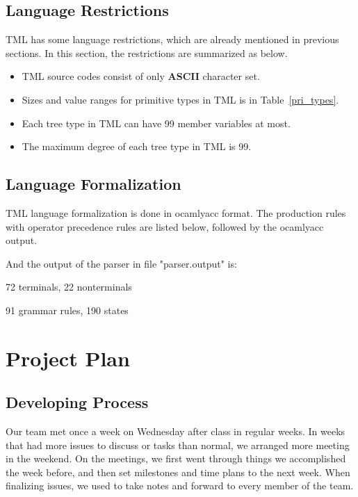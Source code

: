 \documentclass[12pt,psfig,a4]{article}
\begin{document}

\subsection{Language Restrictions}
TML has some language restrictions, which are already mentioned in previous sections. In this section, the restrictions are summarized as below.
\begin{itemize}
\setlength{\itemsep}{0pt}
\setlength{\parskip}{0pt}
\item TML source codes consist of only \textbf{ASCII} character set.
\item Sizes and value ranges for primitive types in TML is in Table~\ref{pri_types}.
\item Each tree type in TML can have 99 member variables at most.
\item The maximum degree of each tree type in TML is 99.

\end{itemize}

\subsection{Language Formalization}
TML language formalization is done in ocamlyacc format. The production rules with operator precedence rules are listed below, followed by the ocamlyacc output.

\begin{tt}
\lstset{basicstyle=\footnotesize}

\mbox{}
\noindent
And the output of the parser in file "parser.output" is:

72 terminals, 22 nonterminals

91 grammar rules, 190 states
\end{tt}



\pagebreak
\section{Project Plan}

\subsection{Developing Process}
Our team met once a week on Wednesday after class in regular weeks. In weeks that had more issues to discuss or tasks than normal, we arranged more meeting in the weekend. On the meetings, we first went through things we accomplished the week before, and then set milestones and time plans to the next week. When finalizing issues, we used to take notes and forward to every member of the team.
\end{document}
